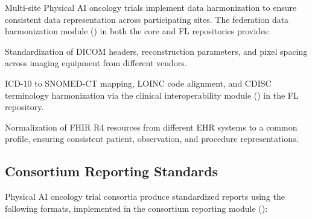 \documentclass[11pt,letterpaper]{article}
\begin{document}
Multi-site Physical AI oncology trials \SHALL{} implement data harmonization to ensure consistent data representation across participating sites. The federation data harmonization module () in both the core and FL repositories provides:

\begin{description}[leftmargin=3.5cm, style=sameline]
  \item[DICOM Normalization] Standardization of DICOM headers, reconstruction parameters, and pixel spacing across imaging equipment from different vendors.
  \item[Vocabulary Mapping] ICD-10 to SNOMED-CT mapping, LOINC code alignment, and CDISC terminology harmonization via the clinical interoperability module () in the FL repository.
  \item[FHIR R4 Standardization] Normalization of FHIR R4 resources from different EHR systems to a common profile, ensuring consistent patient, observation, and procedure representations.
\end{description}

\subsection{Consortium Reporting Standards}

Physical AI oncology trial consortia \SHALL{} produce standardized reports using the following formats, implemented in the consortium reporting module ():
\end{document}
